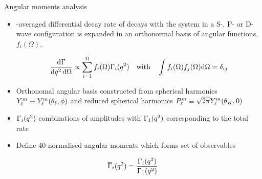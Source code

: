 \documentclass[aspectratio=1610]{beamer}
\begin{document}
\begin{frame}{Angular moments analysis}

\begin{itemize}
\item \CP-averaged differential decay rate of \BdToKpimm decays with the \Kp\pim system in a S-, P- or D-wave configuration is expanded in an orthonormal basis of angular functions, $f_i(\Omega)$, %

\begin{equation*}
\frac{\mathrm{d}\Gamma }{\mathrm{d}{q^2}\,\mathrm{d}\Omega} \propto \sum^{41}_{i=1} f_i (\Omega) \Gamma_i({q^2})
\quad\mbox{with}\quad
\int f_i(\Omega) f_j(\Omega) \mathrm{d}\Omega = \delta_{ij}
\end{equation*}

\medskip

\item Orthonomal angular basis constructed from spherical harmonics $Y^m_\ell \equiv Y^m_\ell (\theta_\ell,\phi)$ and reduced spherical harmonics ${P^m_\ell \equiv \sqrt{2 \pi}Y^m_\ell(\theta_K,0)}$
\item $\Gamma_i({q^2})$ combinations of \KstarJ amplitudes with $\Gamma_{1}({q^2})$ corresponding to the total rate
\item Define 40 normalised angular moments which forms set of observables
\end{itemize}
\begin{equation*}
\overline{\Gamma}_i({q^2}) = \frac{\Gamma_{i}({q^2})}{\Gamma_{1}({q^2})}
\end{equation*}

\end{frame}
\end{document}
